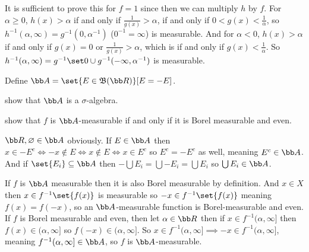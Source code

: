 \eexerc

It is sufficient to prove this for $f=1$ since then we can multiply $h$ by $f$.
For $\alpha\geq0$, $h(x)>\alpha$ if and only if $\frac1{g(x)}>\alpha$, if and only if $0<g(x)<\frac1\alpha$, so $h^{-1}(\alpha,\infty)=g^{-1}(0,\alpha^{-1})$ ($0^{-1}=\infty$) is measurable.
And for $\alpha<0$, $h(x)>\alpha$ if and only if $g(x)=0$ or $\frac1{g(x)}>\alpha$, which is if and only if $g(x)<\frac1\alpha$.
So $h^{-1}(\alpha,\infty)=g^{-1}\set0\cup g^{-1}(-\infty,\alpha^{-1})$ is measurable.

\def\A{{\bb A}}
\bexerc

    Define $\A=\set{E\in{\frak B}({\bb R})}[E=-E]$.
    \benum
        \item show that $\A$ is a $\sigma$-algebra.
        \item show that $f$ is $\A$-measurable if and only if it is Borel measurable and even.
    \eenum

\eexerc

\benum
    \item ${\bb R},\varnothing\in\A$ obviously.
    If $E\in\A$ then $x\in -E^c\iff -x\notin E\iff x\notin E\iff x\in E^c$ so $E^c=-E^c$ as well, meaning $E^c\in\A$.
    And if $\set{E_i}\subseteq\A$ then $-\bigcup E_i=\bigcup-E_i=\bigcup E_i$ so $\bigcup E_i\in\A$.
    \item If $f$ is $\A$ measurable then it is also Borel measurable by definition.
    And $x\in X$ then $x\in f^{-1}\set{f(x)}$ is measurable so $-x\in f^{-1}\set{f(x)}$ meaning $f(x)=f(-x)$, so an $\A$-measurable function is Borel-measurable and even.
    If $f$ is Borel measurable and even, then let $\alpha\in{\bb R}$ then if $x\in f^{-1}(\alpha,\infty]$ then $f(x)\in(\alpha,\infty]$ so $f(-x)\in(\alpha,\infty]$.
    So $x\in f^{-1}(\alpha,\infty]\implies-x\in f^{-1}(\alpha,\infty]$, meaning $f^{-1}(\alpha,\infty]\in\A$, so $f$ is $\A$-measurable.
\eenum

\bye

